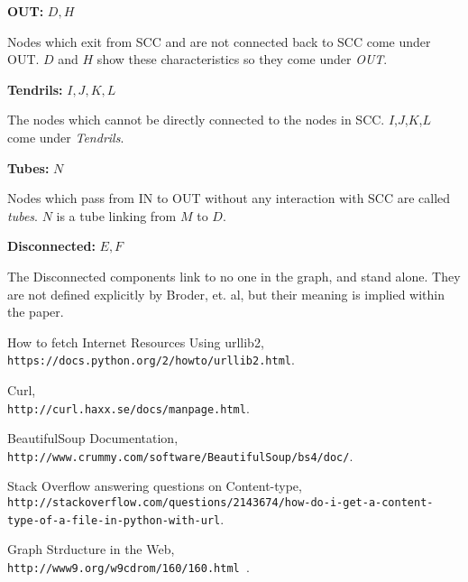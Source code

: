 \textbf{OUT:}  $D, H$

Nodes which exit from SCC and are not connected back to SCC come under OUT. $D$ and $H$ show these characteristics so they come under \emph{OUT}.

\textbf{Tendrils:}  $I, J, K, L$

The nodes which cannot be directly connected to the nodes in SCC. $I$,$J$,$K$,$L$ come under \emph{Tendrils}.

\textbf{Tubes:} $N$

Nodes which pass from IN to OUT without any interaction with SCC are called \emph{tubes}. $N$ is a tube linking from $M$ to $D$.

\textbf{Disconnected:}  $E, F$

The Disconnected components link to no one in the graph, and stand alone.  They are not defined explicitly by Broder, et. al, but their meaning is implied within the paper.

\newpage

\begin{thebibliography}{1}
 How to fetch Internet Resources Using urllib2, 
{\tt \\https://docs.python.org/2/howto/urllib2.html}.

Curl,  
{\tt \\http://curl.haxx.se/docs/manpage.html}.

BeautifulSoup Documentation, 
{\tt \\http://www.crummy.com/software/BeautifulSoup/bs4/doc/}.

Stack Overflow answering questions on Content-type, 
{\tt \\http://stackoverflow.com/questions/2143674/how-do-i-get-a-content-type-of-a-file-in-python-with-url}.

Graph Strducture in the Web, 
{\tt \\http://www9.org/w9cdrom/160/160.html }.

\end{thebibliography}
 
 